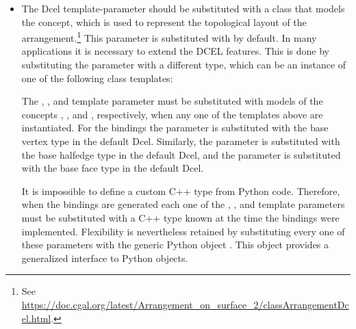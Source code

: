 \begin{itemize}
  The \cmake{} flag 
  specifies which geometry traits should be used for the generated
  bindings; see Table~\ref{tab:aos:gt}.
\item The Dcel template-parameter should be substituted with a class
  that models the  concept, which is
  used to represent the topological layout of the
  arrangement.\footnote{See
    \url{https://doc.cgal.org/latest/Arrangement_on_surface_2/classArrangementDcel.html}.}
  This parameter is substituted with
   by default. In many
  applications it is necessary to extend the DCEL features. This is
  done by substituting the  parameter with a
  different type, which can be an instance of one of the following
  class templates:
  The , , and
   template parameter must be substituted with
  models of the concepts ,
  , and
  , respectively, when any one of
  the templates above are instantiated. For the bindings the
   parameter is substituted with the base
  vertex type in the default Dcel. Similarly, the
   parameter is substituted with the base
  halfedge type in the default Dcel, and the 
  parameter is substituted with the base face type in the default
  Dcel.

  It is impossible to define a custom C++ type from Python code.
  Therefore, when the bindings are generated each one of the
  , , and
   template parameters must be substituted
  with a C++ type known at the time the bindings were implemented.
  Flexibility is nevertheless retained by substituting every one
  of these parameters with the generic Python object
  . This object provides a
  generalized interface to Python objects.


\end{itemize}
